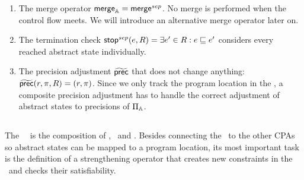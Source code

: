 \begin{enumerate}[leftmargin=*,label=\arabic*.]
\item The merge operator $\operatorname{\operatorname{\mathsf{merge}}}_{\mathbb{A}} = \operatorname{\operatorname{\mathsf{merge}}}^{sep}$. No merge is performed when the control flow meets. We will introduce an alternative merge operator later on.
\item The termination check $\operatorname{\operatorname{\mathsf{stop}}}^{sep}(e, R) = \exists e' \in R: e \sqsubseteq e'$ considers every reached abstract state individually.

\item
The precision adjustment $\operatorname{\widetilde{\operatorname{\operatorname{\mathsf{prec}}}}}$ that does not change anything: $\operatorname{\widetilde{\operatorname{\operatorname{\mathsf{prec}}}}}(r, \pi, R) = (r, \pi)$.
Since we only track the program location in the \locationCPA, a composite precision adjustment has to handle the correct adjustment of abstract states to precisions of $\Pi_{\mathbb{A}}$.

\end{enumerate}


\subsection{\SymbolicExecutionCPA}
The \symbolicExecutionCPA\ \cite{Lemberger2015}\ is the composition of \locationCPA, \symbolicValueAnalysisCPA\ and \constraintsCPA.
Besides connecting the \locationCPA\ to the other CPAs so abstract states can be mapped to a program location, its most important task is the definition of a strengthening operator that creates new constraints in the \constraintsCPA\ and checks their satisfiability.

